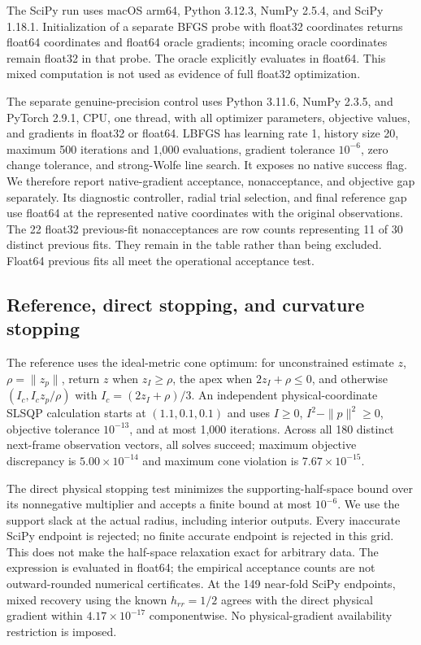 \documentclass[10pt,a4paper]{article}
\begin{document}
The SciPy run uses macOS arm64, Python 3.12.3, NumPy 2.5.4, and SciPy 1.18.1. Initialization of a separate BFGS probe with float32 coordinates returns float64 coordinates and float64 oracle gradients; incoming oracle coordinates remain float32 in that probe. The oracle explicitly evaluates in float64. This mixed computation is not used as evidence of full float32 optimization.

The separate genuine-precision control uses Python 3.11.6, NumPy 2.3.5, and PyTorch 2.9.1, CPU, one thread, with all optimizer parameters, objective values, and gradients in float32 or float64. LBFGS has learning rate 1, history size 20, maximum 500 iterations and 1,000 evaluations, gradient tolerance $10^{-6}$, zero change tolerance, and strong-Wolfe line search. It exposes no native success flag. We therefore report native-gradient acceptance, nonacceptance, and objective gap separately. Its diagnostic controller, radial trial selection, and final reference gap use float64 at the represented native coordinates with the original observations. The 22 float32 previous-fit nonacceptances are row counts representing 11 of 30 distinct previous fits. They remain in the table rather than being excluded. Float64 previous fits all meet the operational acceptance test.

\subsection{Reference, direct stopping, and curvature stopping}
The reference uses the ideal-metric cone optimum: for unconstrained estimate $z$, $\rho=\|z_p\|$, return $z$ when $z_I\geq\rho$, the apex when $2z_I+\rho\leq0$, and otherwise $(I_c,I_c z_p/\rho)$ with $I_c=(2z_I+\rho)/3$. An independent physical-coordinate SLSQP calculation starts at $(1.1,0.1,0.1)$ and uses $I\geq0$, $I^2-\|p\|^2\geq0$, objective tolerance $10^{-13}$, and at most 1,000 iterations. Across all 180 distinct next-frame observation vectors, all solves succeed; maximum objective discrepancy is $5.00\times10^{-14}$ and maximum cone violation is $7.67\times10^{-15}$.

The direct physical stopping test minimizes the supporting-half-space bound over its nonnegative multiplier and accepts a finite bound at most $10^{-6}$. We use the support slack at the actual radius, including interior outputs. Every inaccurate SciPy endpoint is rejected; no finite accurate endpoint is rejected in this grid. This does not make the half-space relaxation exact for arbitrary data. The expression is evaluated in float64; the empirical acceptance counts are not outward-rounded numerical certificates. At the 149 near-fold SciPy endpoints, mixed recovery using the known $h_{rr}=1/2$ agrees with the direct physical gradient within $4.17\times10^{-17}$ componentwise. No physical-gradient availability restriction is imposed.
\end{document}
